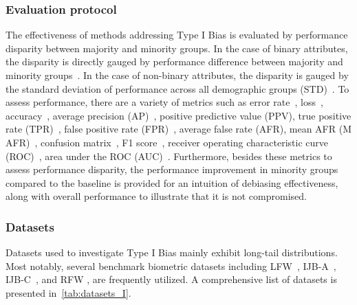 \subsubsection{Evaluation protocol}
The effectiveness of methods addressing Type I Bias is evaluated by performance disparity between majority and minority groups. 
In the case of binary attributes, the disparity is directly gauged by performance difference between majority and minority groups~\cite{Timnit_sex_classification_PPB,DP_difference_fpr_GAN_debiasing,FPR_Penalty_Loss}.
In the case of non-binary attributes, the disparity is gauged by the standard deviation of performance across all demographic groups (STD)~\cite{DB_VAE_algorithmic_bias, DebFace, GAC, Asymmetric_Rejection_Loss}.
To assess performance, there are a variety of metrics such as error rate~\cite{Timnit_sex_classification_PPB,fairnessgan_DP_difference_error_rate}, loss~\cite{representation_disparity}, accuracy~\cite{multiaccuracy}, average precision (AP)~\cite{DP_difference_fpr_GAN_debiasing}, positive predictive value (PPV), true positive rate (TPR)~\cite{pass,BR_Net_dataset_vs_task}, false positive rate (FPR)~\cite{FPR_Penalty_Loss}, average false rate (AFR), mean AFR (M AFR)~\cite{inclusivefacenet}, confusion matrix~\cite{DebFace}, F1 score~\cite{BR_Net_dataset_vs_task}, receiver operating characteristic curve (ROC)~\cite{RL_RBN, fairnessgan_DP_difference_error_rate, SAN, Asymmetric_Rejection_Loss,debias_balanced_AUCROC}, area under the ROC (AUC)~\cite{FlowSAN, DebFace, BR_Net_dataset_vs_task}.
Furthermore, besides these metrics to assess performance disparity, the performance improvement in minority groups compared to the baseline is provided for an intuition of debiasing effectiveness, along with overall performance to illustrate that it is not compromised.




\subsubsection{Datasets}
Datasets used to investigate Type I Bias mainly exhibit long-tail distributions.
Most notably, several benchmark biometric datasets including LFW~\cite{LFW}, IJB-A~\cite{IJBA}, IJB-C~\cite{IJBC}, and RFW \cite{RFW_IMAN}, are frequently utilized.
A comprehensive list of datasets is presented in~\cref{tab:datasets_I}.









